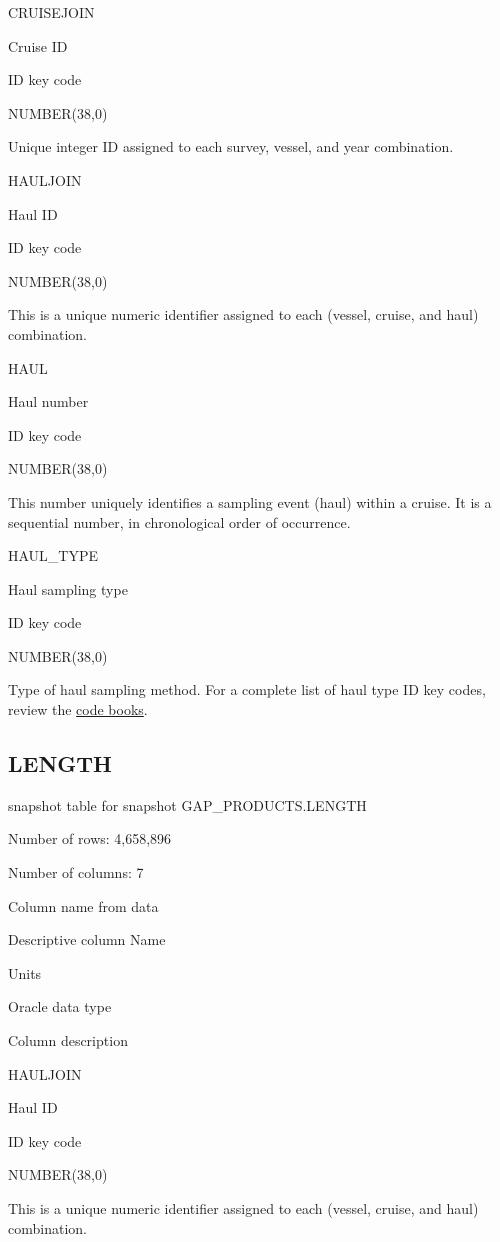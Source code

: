 \documentclass[
  letterpaper,
  oneside,
  open=any]{scrbook}
\begin{document}
CRUISEJOIN

Cruise ID

ID key code

NUMBER(38,0)

Unique integer ID assigned to each survey, vessel, and year combination.

HAULJOIN

Haul ID

ID key code

NUMBER(38,0)

This is a unique numeric identifier assigned to each (vessel, cruise,
and haul) combination.

HAUL

Haul number

ID key code

NUMBER(38,0)

This number uniquely identifies a sampling event (haul) within a cruise.
It is a sequential number, in chronological order of occurrence.

HAUL\_TYPE

Haul sampling type

ID key code

NUMBER(38,0)

Type of haul sampling method. For a complete list of haul type ID key
codes, review the
\href{https://www.fisheries.noaa.gov/resource/document/groundfish-survey-species-code-manual-and-data-codes-manual}{code
books}.

\subsection{LENGTH}\label{length}

snapshot table for snapshot GAP\_PRODUCTS.LENGTH

Number of rows: 4,658,896

Number of columns: 7

Column name from data

Descriptive column Name

Units

Oracle data type

Column description

HAULJOIN

Haul ID

ID key code

NUMBER(38,0)

This is a unique numeric identifier assigned to each (vessel, cruise,
and haul) combination.
\end{document}
